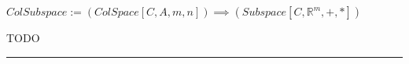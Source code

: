 \documentclass{book}
\newcommand{\abr}{:=}
\begin{document}
$ColSubspace \abr (ColSpace[C, A, m, n]) \implies (Subspace[C, \mathbb{R}^m, +, *])$
\begin{enumerate}
  \lit TODO
\end{enumerate} \vspace{.75mm} \hrule \vspace{.75mm} \ \\

\begin{comment}
  $SetSum[A + B, A, B, V, +, *] \abr (VectorSpace[V, +, *]) \land (A, B \subseteq V) \land (A + B = \{a + b | (a \in A) \land (b \in B)\})$ \\

  $DirSum[A \oplus B, A, B, V, +, *] \abr \left(\begin{array}{ll}
    (Subspace[A, V, +, *]) \hfill \land \hfill (Subspace[B, V, +, *]) \hfill \land \hfill \\
    (SetSum[A + B, A, B, V, +, *]) \hfill \land \hfill (\forall_{s \in A + B} \exists!_{\langle a, b \rangle \in A \times B}(s = a + b))
  \end{array}\right)$ \\


\end{comment}
\end{document}
